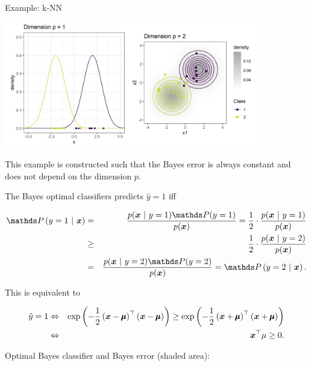 \begin{vbframe}{Example: k-NN}
\framebreak 

\begin{center}
\includegraphics[width = 11cm]{figure/knn_density_plot.png}
\end{center}

\framebreak 
This example is constructed such that the Bayes error is always constant and does not depend on the dimension $p$. 

\lz 

The Bayes optimal classifiers predicts $\hat y = 1$ iff

\begin{footnotesize}
  \begin{eqnarray*}
  \P\left(y = 1 ~|~ \xv\right) &=& \frac{p(\xv ~|~y = 1)\P(y = 1)}{p(\xv)} = \frac{1}{2} \cdot \frac{p(\xv ~|~y = 1)}{p(\xv)}\\
  &\ge& \frac{1}{2} \cdot \frac{p(\xv ~|~y = 2)}{p(\xv)} \\ &=& \frac{p(\xv ~|~y = 2)\P(y = 2)}{p(\xv)} = \P\left(y = 2 ~|~ \xv\right). 
  \end{eqnarray*}
\end{footnotesize}

This is equivalent to 

\vspace*{-0.5cm}

\begin{footnotesize}
  \begin{eqnarray*}
  \hat y = 1 &\Leftrightarrow& \exp\left(-\frac{1}{2} \left(\bm{x} - \pmb\mu\right)^\top \left(\bm{x} - \pmb\mu\right)\right) \ge \exp\left(-\frac{1}{2} \left(\bm{x} + \pmb\mu\right)^\top \left(\bm{x} + \pmb\mu\right)\right) \\
  &\Leftrightarrow& \bm{x}^\top \mu \ge 0. 
  \end{eqnarray*}
\end{footnotesize}

\framebreak

Optimal Bayes classifier and Bayes error (shaded area):


\end{vbframe}
